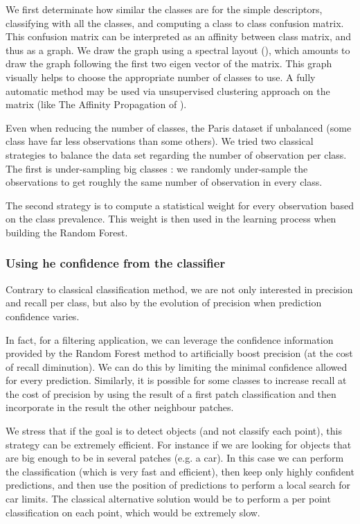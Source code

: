 		We first determinate how similar the classes are for the simple descriptors, classifying with all the classes, and computing a class to class confusion matrix.
		This confusion matrix can be interpreted as an affinity between class matrix, and thus as a graph.
		We draw the graph using a spectral layout (\cite{Networkx2014}),
		 which amounts to draw the graph following the first two eigen vector of the matrix.
		This graph visually helps to choose the appropriate number of classes to use.
		A fully automatic method may be used via unsupervised clustering approach on the matrix 
		(like The Affinity Propagation of \cite{Frey2007}).
		
		Even when reducing the number of classes, the Paris dataset if unbalanced (some class have far less observations than some others).
		We tried two classical strategies to balance the data set regarding the number of observation per class.
		The first is under-sampling big classes : we randomly under-sample the observations to get roughly the same number of observation in every class.
		
		The second strategy is to compute a statistical weight for every observation based on the class prevalence. 
		This weight is then used in the learning process when building the Random Forest.
		
		\subsubsection{Using he confidence from the classifier}  
		Contrary to classical classification method, we are not only interested in precision and recall per class, but also by the evolution of precision when prediction confidence varies.
		
		In fact, for a filtering application, we can leverage the confidence information provided by the Random Forest method to artificially boost precision (at the cost of recall diminution). We can do this by limiting the minimal confidence allowed for every prediction.
		Similarly, it is possible for some classes to increase recall at the cost of precision by using the result of a first patch classification and then incorporate in the result the other neighbour patches. 
		
		We stress that if the goal is to detect objects (and not classify each point), this strategy can be extremely efficient.
		For instance if we are looking for objects that are big enough to be in several patches (e.g. a car).
		In this case we can perform the classification (which is very fast and efficient), then keep only highly confident predictions, and then use the position of predictions to perform a local search for car limits.
		The classical alternative solution would be to perform a per point classification on each point, which would be extremely slow.
		 